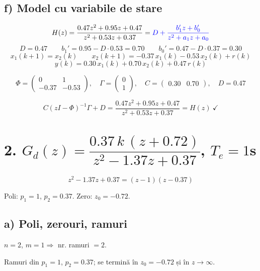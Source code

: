 \documentclass[10pt,a4paper]{article}
\begin{document}
\begin{center}
\end{center}

\subsection*{f) Model cu variabile de stare}
$$H(z)=\frac{0.47z^2+0.95z+0.47}{z^2+0.53z+0.37}=\textcolor{blue}{D+\frac{b_1'z+b_0'}{z^2+a_1z+a_0}}$$
$$D=0.47\qquad b_1'=0.95-D\cdot0.53=0.70\qquad b_0'=0.47-D\cdot0.37=0.30$$
$$x_1(k+1)=x_2(k)\qquad x_2(k+1)=-0.37\,x_1(k)-0.53\,x_2(k)+r(k)$$
$$y(k)=0.30\,x_1(k)+0.70\,x_2(k)+0.47\,r(k)$$
\begin{res}
$$\Phi=\begin{pmatrix}0&1\\-0.37&-0.53\end{pmatrix},\quad \Gamma=\begin{pmatrix}0\\1\end{pmatrix},\quad C=\begin{pmatrix}0.30&0.70\end{pmatrix},\quad D=0.47$$
\end{res}
\begin{chk}
$$C(zI-\Phi)^{-1}\Gamma+D=\frac{0.47z^2+0.95z+0.47}{z^2+0.53z+0.37}=H(z)\ \checkmark$$
\end{chk}

\section*{2. $G_d(z)=\dfrac{0.37\,k\,(z+0.72)}{z^2-1.37z+0.37}$, $T_e=1$s}
$$z^2-1.37z+0.37=(z-1)(z-0.37)$$
\begin{res}
Poli: $p_1=1$, $p_2=0.37$. Zero: $z_0=-0.72$.
\end{res}

\subsection*{a) Poli, zerouri, ramuri}
$n=2$, $m=1\Rightarrow$ nr. ramuri $=2$.
\begin{res}
Ramuri din $p_1=1$, $p_2=0.37$; se termină în $z_0=-0.72$ și în $z\to\infty$.
\end{res}
\end{document}
